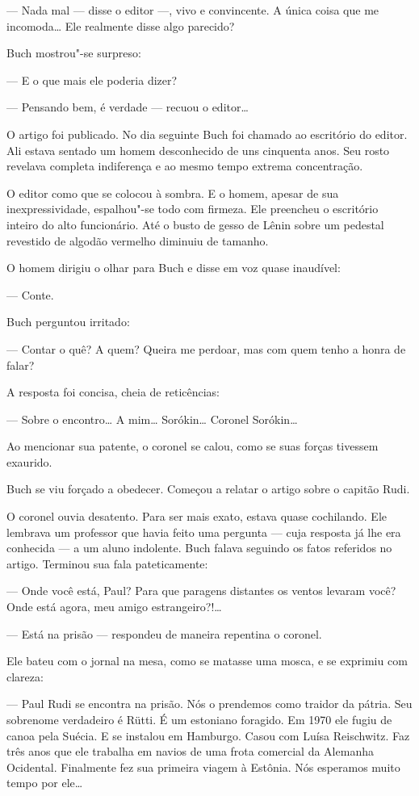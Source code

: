 --- Nada mal --- disse o editor ---, vivo e convincente. A única coisa
que me incomoda\ldots{} Ele realmente disse algo parecido?

Buch mostrou"-se surpreso:

--- E o que mais ele poderia dizer?

--- Pensando bem, é verdade --- recuou o editor\ldots{}

O artigo foi publicado. No dia seguinte Buch foi chamado ao escritório
do editor. Ali estava sentado um homem desconhecido de uns cinquenta
anos. Seu rosto revelava completa indiferença e ao mesmo tempo extrema
concentração.

O editor como que se colocou à sombra. E o homem, apesar de sua
inexpressividade, espalhou"-se todo com firmeza. Ele preencheu o
escritório inteiro do alto funcionário. Até o busto de gesso de Lênin
sobre um pedestal revestido de algodão vermelho diminuiu de tamanho.

O homem dirigiu o olhar para Buch e disse em voz quase inaudível:

--- Conte.

Buch perguntou irritado:

--- Contar o quê? A quem? Queira me perdoar, mas com quem tenho a honra
de falar?

A resposta foi concisa, cheia de reticências:

--- Sobre o encontro\ldots{} A mim\ldots{} Sorókin\ldots{} Coronel Sorókin\ldots{}

Ao mencionar sua patente, o coronel se calou, como se suas forças
tivessem exaurido.

Buch se viu forçado a obedecer. Começou a relatar o artigo sobre o
capitão Rudi.

O coronel ouvia desatento. Para ser mais exato, estava quase cochilando.
Ele lembrava um professor que havia feito uma pergunta --- cuja resposta
já lhe era conhecida --- a um aluno indolente. Buch falava seguindo os
fatos referidos no artigo. Terminou sua fala pateticamente:

--- Onde você está, Paul? Para que paragens distantes os ventos levaram
você? Onde está agora, meu amigo estrangeiro?!\ldots{}

--- Está na prisão --- respondeu de maneira repentina o coronel.

Ele bateu com o jornal na mesa, como se matasse uma mosca, e se exprimiu
com clareza:

--- Paul Rudi se encontra na prisão. Nós o prendemos como traidor da
pátria. Seu sobrenome verdadeiro é Rütti. É um estoniano foragido. Em
1970 ele fugiu de canoa pela Suécia. E se instalou em Hamburgo. Casou
com Luísa Reischwitz. Faz três anos que ele trabalha em navios de uma
frota comercial da Alemanha Ocidental. Finalmente fez sua primeira
viagem à Estônia. Nós esperamos muito tempo por ele\ldots{}

